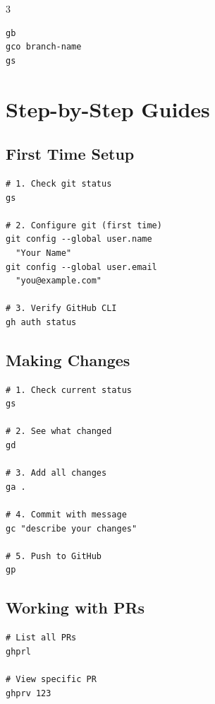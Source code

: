 \documentclass[11pt,landscape]{article}
\begin{document}
\begin{multicols}{3}
\begin{tcolorbox}[colback=highlightbg,colframe=commandcolor,boxrule=1.5pt,arc=2pt,left=8pt,right=8pt,top=6pt,bottom=6pt,title={\large\textbf{4. Switch Branches}}]
\begin{Verbatim}[fontsize=\Large,frame=none]
gb
gco branch-name
gs
\end{Verbatim}
\end{tcolorbox}

\columnbreak

\section*{Step-by-Step Guides}

\subsection*{First Time Setup}

\begin{Verbatim}[fontsize=\normalsize,frame=single]
# 1. Check git status
gs

# 2. Configure git (first time)
git config --global user.name
  "Your Name"
git config --global user.email
  "you@example.com"

# 3. Verify GitHub CLI
gh auth status
\end{Verbatim}

\subsection*{Making Changes}

\begin{Verbatim}[fontsize=\normalsize,frame=single]
# 1. Check current status
gs

# 2. See what changed
gd

# 3. Add all changes
ga .

# 4. Commit with message
gc "describe your changes"

# 5. Push to GitHub
gp
\end{Verbatim}

\subsection*{Working with PRs}

\begin{Verbatim}[fontsize=\normalsize,frame=single]
# List all PRs
ghprl

# View specific PR
ghprv 123


\end{Verbatim}
\end{multicols}
\end{document}

